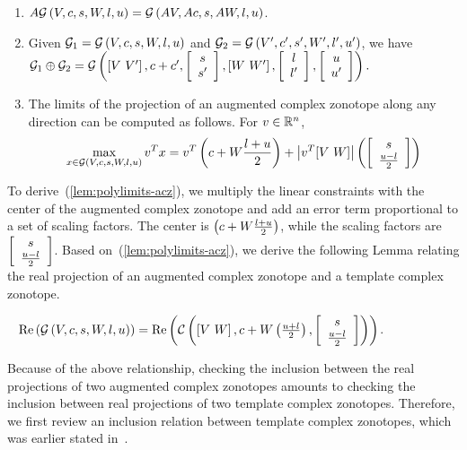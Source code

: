 \begin{enumerate}
\item $A\mathcal{G}\left(V,c,s,W,l,u\right) = \mathcal{G}\left(AV,Ac,s,AW,l,u\right)$.
\item Given $\mathcal{G}_1=\mathcal{G}\left(V,c,s,W,l,u\right)$ and $\mathcal{G}_2=\mathcal{G}\left(V^\prime,c^\prime,s^\prime,W^\prime,l^\prime,u^\prime\right)$, we have $\mathcal{G}_1 \oplus \mathcal{G}_2= \mathcal{G}\left(\left[V~V^\prime\right],c+c^\prime,\left[\begin{array}{c}{s}\\{s^\prime} \end{array}\right],\left[W~W^\prime\right],\left[\begin{array}{c}{l}\\{l^\prime} \end{array}\right],\left[\begin{array}{c}{u}\\{u^\prime} \end{array}\right]\right).$

%
\item The limits of the projection of an augmented complex zonotope along
any direction can be computed as follows. For $v\in\mathbb{R}^n$,
\begin{equation}\label{lem:polylimits-acz}
\max_{x\in\mathcal{G}\left(V,c,s,W,l,u\right)}v^Tx = v^T\left(c+W\frac{l+u}{2}\right)+\left|v^T[V~W]\right|\left(\left[\begin{array}{c}{s}\\{\frac{u-l}{2}} \end{array}\right]\right)
\end{equation}
\end{enumerate}
%
To derive~(\ref{lem:polylimits-acz}), we multiply the linear
constraints with the center of the augmented complex zonotope and add
an error term proportional to a set of scaling factors.  The center is
$\left(c+W\frac{l+u}{2}\right)$, while the scaling factors are
$\left[\begin{array}{c}{s}\\{\frac{u-l}{2}} \end{array}\right]$.  Based
on~(\ref{lem:polylimits-acz}), we derive the following Lemma relating
the real projection of an augmented complex zonotope and a template
complex zonotope. 
%
\begin{lemma}~\label{lem:conversion}
$\operatorname{\operatorname{Re}}\left(\mathcal{G}\left(V,c,s,W,l,u\right)\right) = \operatorname{\operatorname{Re}}\left(\mathcal{C}\left(\left[V~W\right],c+W\left(\frac{u+l}{2}\right),\left[\begin{array}{c}{s}\\{\frac{u-l}{2}} \end{array}\right]\right)\right)$.
\end{lemma}
%
Because of the above relationship, checking the inclusion between the
real projections of two augmented complex zonotopes amounts to
checking the inclusion between real projections of two template
complex zonotopes.  Therefore, we first review an inclusion relation
between template complex zonotopes, which was earlier stated
in~\cite{tcz2017}.

